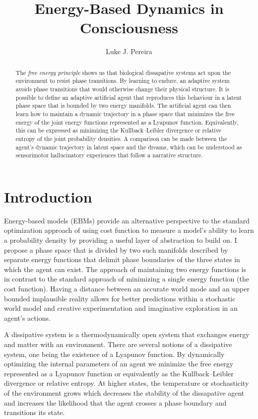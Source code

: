 \documentclass{article}
\title{Energy-Based Dynamics in Consciousness}
\author{%
  Luke J. Pereira \\
}
\begin{document}
\maketitle


\begin{abstract}
The \textit{free energy principle} shows us that biological dissapative systems act upon the environment to resist phase transitions. By learning to endure, an adaptive system avoids phase transitions that would otherwise change their physical structure. It is possible to define an adaptive artificial agent that reproduces this behaviour in a latent phase space that is bounded by two energy manifolds. The artificial agent can then learn how to maintain a dynamic trajectory in a phase space that minimizes the free energy of the joint energy functions represented as a Lyapunov function. Equivalently, this can  be expressed as minimizing the Kullback–Leibler divergence or relative entropy of the joint probability densities. A comparison can be made between the agent's dynamic trajectory in latent space and the dreams, which can be understood as sensorimotor hallucinatory experiences that follow a narrative structure.
\end{abstract}

\vspace{8pt}

\newpage

\section{Introduction}

Energy-based models (EBMs) provide an alternative perspective to the standard optimization approach of using cost function to measure a model's ability to learn a probability density by providing a useful layer of abstraction to build on. I propose a phase space that is divided by two such manifolds described by separate energy functions that delimit phase boundaries of the three states in which the agent can exist. The approach of maintaining two energy functions is in contrast to the standard approach of minimizing a single energy function (the cost function). Having a distance between an accurate world mode and an upper bounded implausible reality allows for better predictions within a stochastic world model and creative experimentation and imaginative exploration in an agent's actions. 

A dissipative system is a thermodynamically open system that exchanges energy and matter with an environment. There are several notions of a dissipative system, one being the existence of a Lyapunov function. By dynamically optimizing the internal parameters of an agent we minimize the free energy represented as a Lyapunov function or equivalently as the Kullback–Leibler divergence or relative entropy. At higher states, the temperature or stochasticity of the environment grows which decreases the stability of the dissapative agent and increases the likelihood that the agent crosses a phase boundary and transitions its state.
\end{document}
